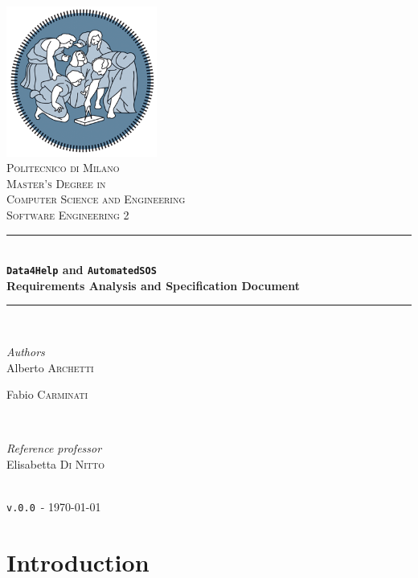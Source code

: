 \documentclass[12pt]{article}
\def \thisDocVersion {\texttt{v.0.0}}
\begin{document}
\begin{titlepage}
  \newcommand{\HRule}{\rule{\linewidth}{0.5mm}}
  \center
  \includegraphics[width=140pt]{polimi.png}\\[1cm]
  \textsc{\LARGE Politecnico di Milano}\\[1cm]
  \textsc{\Large Master's Degree in \\Computer Science and Engineering}\\[0.5cm]
  \textsc{\large Software Engineering 2}\\[0.5cm]
  \HRule \\[0.4cm]
  { \huge \bfseries \texttt{Data4Help} and \texttt{AutomatedSOS}\\[0.4cm] Requirements Analysis and Specification Document }\\[0.4cm]

  \HRule \\[1cm]
  \begin{minipage}{0.4\textwidth}
  \begin{flushleft} \large
  \emph{Authors}\\
  Alberto \textsc{Archetti}

  Fabio \textsc{Carminati}
  \end{flushleft}
  \end{minipage}
  ~
  \begin{minipage}{0.4\textwidth}
  \begin{flushright} \large
  \emph{Reference professor} \\
  Elisabetta \textsc{Di Nitto}
  \end{flushright}
  \end{minipage}\\[1cm]
  {\large \thisDocVersion\ - \today}\\[1cm]
  \vfill
\end{titlepage}

\clearpage
{}
\nonumber
\tableofcontents
\clearpage
{}

\clearpage
\section{Introduction}
\label{sec:intro}
\end{document}
